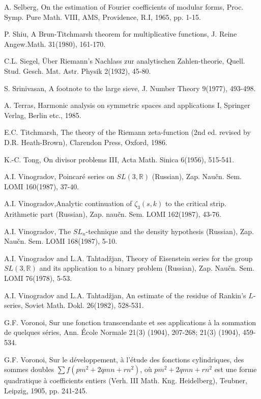 \begin{thebibliography}{99}
 A. Selberg, On the estimation of Fourier coefficients of modular forms, Proc. Symp. Pure Math. VIII, AMS, Providence, R.I, 1965, pp. 1-15.

 P. Shiu, A Brun-Titchmarsh theorem for multiplicative functions, J. Reine Angew.Math. 31(1980), 161-170.

 C.L. Siegel, \"Uber Riemann's Nachlass zur analytischen Zahlen-theorie, Quell. Stud. Gesch. Mat. Astr. Physik 2(1932), 45-80.

 S. Srinivasan, A footnote to the  large sieve, J. Number Theory 9(1977), 493-498.

 A. Terras, Harmonic analysis on symmetric spaces and applications I, Springer Verlag, Berlin etc., 1985.

 E.C. Titchmarsh, The theory of the Riemann zeta-function (2nd ed. revised by D.R. Heath-Brown), Clarendon Press, Oxford, 1986.

 K.-C. Tong, On divisor problems III, Acta Math. Sinica 6(1956), 515-541.

 A.I. Vinogradov, Poincar\'e series on $SL(3,\mathbb{R})$ (Russian), Zap. Nau\v cn. Sem. LOMI 160(1987), 37-40.

 A.I. Vinogradov,\pageoriginale Analytic continuation of $\zeta_3(s,k)$ to the critical strip. Arithmetic part (Russian), Zap. nau\v cn. Sem. LOMI 162(1987), 43-76.

 A.I. Vinogradov, The $SL_n$-technique and the density hypothesis (Russian), Zap. Nau\v cn. Sem. LOMI 168(1987), 5-10.

 A.I. Vinogradov and L.A. Tahtad\v zjan, Theory of Eisenstein series for the group $SL(3,\mathbb{R})$ and its application to a binary problem (Russian), Zap. Nau\v cn. Sem. LOMI 76(1978), 5-53.

 A.I. Vinogradov and L.A. Tahtad\v zjan, An estimate of the residue of Rankin's $L$-series, Soviet Math. Dokl. 26(1982), 528-531.

 G.F. Voronoi, Sur une fonction transcendante et ses applications \`a la sommation de quelques s\'eries, Ann. \'Ecole Normale 21(3) (1904), 207-268; 21(3) (1904), 459-534.

 G.F. Voronoi, Sur le d\'eveloppement, \`a l'\'etude des fonctions cylindriques, des sommes doubles $\sum f (pm^2 + 2 q mn + rn^2)$, o\`u $pm^2 + 2 q mn + rn^2$ est une forme quadratique \`a coefficients entiers (Verh. III Math. Kng. Heidelberg), Teubner, Leipzig, 1905, pp. 241-245.


\end{thebibliography}
